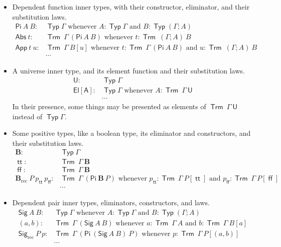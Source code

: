 \documentclass[11pt]{article}
\DeclareMathOperator{\rec}{rec}
\DeclareMathOperator{\Typ}{\mathsf{Typ}}
\DeclareMathOperator{\Trm}{\mathsf{Trm}}
\DeclareMathOperator{\true}{\mathsf{tt}}
\DeclareMathOperator{\false}{\mathsf{ff}}
\newcommand{\0}{\mathbf{0}}
\newcommand{\1}{\mathbf{1}}
\newcommand{\bool}{\mathbf{B}}
\begin{document}
\begin{itemize}
    \item Dependent function inner types, with their constructor, eliminator, and their substitution laws.
    $$
        \begin{array}{rl}
            \mathsf{Pi}\ A\ B:& \Typ\Gamma \text{ whenever } A : \Typ \Gamma \text{ and } B : \Typ (\Gamma;A)\\
            \mathsf{Abs}\ t :& \Trm\ \Gamma\ (\mathsf{Pi}\ A\ B) \text{ whenever } t : \Trm\ (\Gamma;A)\ B\\
            \mathsf{App}\ t\ u:& \Trm\ \Gamma\ B[u] \text{ whenever } t : \Trm\ \Gamma\ (\mathsf{Pi}\ A\ B) \text{ and } u : \Trm\ (\Gamma;A)\ B\\
            & \cdots
        \end{array}
    $$
    \item A universe inner type, and its element function and their substitution laws.
    $$
        \begin{array}{rl}
            \mathsf{U}:& \Typ \Gamma\\
            \mathsf{El[A]}:& \Typ \Gamma \text{ whenever } A:\Trm\ \Gamma\ \mathsf{U}\\
            &\cdots
        \end{array}
    $$
    In their presence, some things may be presented as elements of $\Trm\ \Gamma\ \mathsf{U}$ instead of $\Typ\Gamma$.
    \item Some positive types, like a boolean type, its eliminator and constructors, and their substitution laws.
    $$
        \begin{array}{rl}
            \bool:& \Typ \Gamma\\
            \true:& \Trm\ \Gamma\ \bool\\
            \false:& \Trm\ \Gamma\ \bool\\
            \bool_{\rec}\ P\ p_{\true}\ p_{\false}:& \Trm\ \Gamma\ (\mathsf{Pi}\ \bool\ P) \text{ whenever } p_{\true} : \Trm\ \Gamma\ P[\true] \text{ and } p_{\false} : \Trm\ \Gamma\ P[\false]\\
            &\cdots
        \end{array}
    $$
    \item Dependent pair inner types, eliminators, constructors, and laws.
    $$
        \begin{array}{rl}
            \mathsf{Sig}\ A\ B:& \Typ\Gamma \text{ whenever } A : \Typ \Gamma \text{ and } B : \Typ (\Gamma;A)\\
            (a,b) :& \Trm\ \Gamma\ (\mathsf{Sig}\ A\ B) \text{ whenever } a : \Trm\ \Gamma\ A  \text{ and } b : \Trm\ \Gamma\ B[a]\\
            \mathsf{Sig}_{\rec}\ P\ p :& \Trm\ \Gamma\ (\mathsf{Pi}\ (\mathsf{Sig}\ A\ B)\ P) \text{ whenever } p :\Trm\ \Gamma\ P[(a,b)]\\
            &\cdots
        \end{array}
    $$
\end{itemize}
\end{document}

